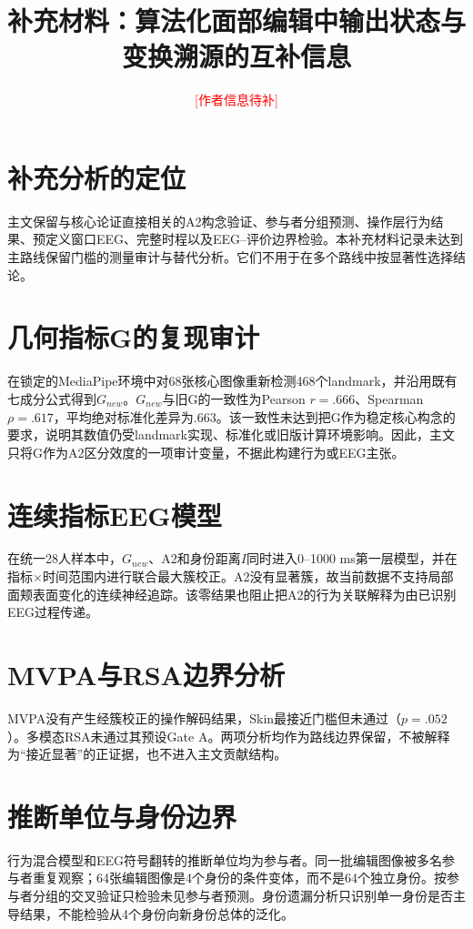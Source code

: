 \documentclass[11pt,a4paper]{ctexart}
\title{补充材料：算法化面部编辑中输出状态与变换溯源的互补信息}
\author{\textcolor{red}{[作者信息待补]}}
\date{}
\begin{document}
\maketitle

\section{补充分析的定位}

主文保留与核心论证直接相关的A2构念验证、参与者分组预测、操作层行为结果、预定义窗口EEG、完整时程以及EEG--评价边界检验。本补充材料记录未达到主路线保留门槛的测量审计与替代分析。它们不用于在多个路线中按显著性选择结论。

\section{几何指标G的复现审计}

在锁定的MediaPipe环境中对68张核心图像重新检测468个landmark，并沿用既有七成分公式得到$G_{new}$。$G_{new}$与旧G的一致性为Pearson $r=.666$、Spearman $\rho=.617$，平均绝对标准化差异为$.663$。该一致性未达到把G作为稳定核心构念的要求，说明其数值仍受landmark实现、标准化或旧版计算环境影响。因此，主文只将G作为A2区分效度的一项审计变量，不据此构建行为或EEG主张。

\section{连续指标EEG模型}

在统一28人样本中，$G_{new}$、A2和身份距离$I$同时进入0--1000 ms第一层模型，并在指标$\times$时间范围内进行联合最大簇校正。A2没有显著簇，故当前数据不支持局部面颊表面变化的连续神经追踪。该零结果也阻止把A2的行为关联解释为由已识别EEG过程传递。

\section{MVPA与RSA边界分析}

MVPA没有产生经簇校正的操作解码结果，Skin最接近门槛但未通过（$p=.052$）。多模态RSA未通过其预设Gate A。两项分析均作为路线边界保留，不被解释为“接近显著”的正证据，也不进入主文贡献结构。

\section{推断单位与身份边界}

行为混合模型和EEG符号翻转的推断单位均为参与者。同一批编辑图像被多名参与者重复观察；64张编辑图像是4个身份的条件变体，而不是64个独立身份。按参与者分组的交叉验证只检验未见参与者预测。身份遗漏分析只识别单一身份是否主导结果，不能检验从4个身份向新身份总体的泛化。
\end{document}
